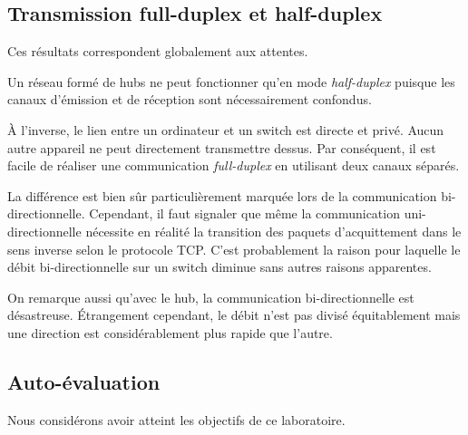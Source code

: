 \documentclass[11pt,a4paper]{article}
\begin{document}
\subsection{Transmission full-duplex et half-duplex}

Ces résultats correspondent globalement aux attentes.

Un réseau formé de hubs ne peut fonctionner qu'en mode \textit{half-duplex} puisque les canaux d'émission et de réception sont nécessairement confondus.

À l'inverse, le lien entre un ordinateur et un switch est directe et privé. Aucun autre appareil ne peut directement transmettre dessus. Par conséquent, il est facile de réaliser une communication \textit{full-duplex} en utilisant deux canaux séparés.

La différence est bien sûr particulièrement marquée lors de la communication bi-directionnelle. Cependant, il faut signaler que même la communication uni-directionnelle nécessite en réalité la transition des paquets d'acquittement dans le sens inverse selon le protocole TCP. C'est probablement la raison pour laquelle le débit bi-directionnelle sur un switch diminue sans autres raisons apparentes.

On remarque aussi qu'avec le hub, la communication bi-directionnelle est désastreuse. Étrangement cependant, le débit n'est pas divisé équitablement mais une direction est considérablement plus rapide que l'autre.

\subsection{Auto-évaluation}

Nous considérons avoir atteint les objectifs de ce laboratoire.
\end{document}
